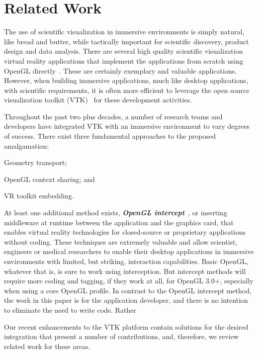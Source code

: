 \section{Related Work}

The use of scientific visualization in immersive environments is simply natural, like bread and butter, while tactically important for scientific discovery, product design and data analysis. There are several high quality scientific visualization virtual reality applications that implement the applications from scratch using OpenGL directly~\cite{Billen:2008, LaViola:2007, Schulze:2001, Rantzau:1998}. These are certainly exemplary and valuable applications. However, when building immersive applications, much like desktop applications, with scientific requirements, it is often more efficient to leverage the open source visualization toolkit (VTK)~\cite{Schroeder:2004} for these development activities.

Throughout the past two plus decades, a number of research teams and developers have integrated VTK with an immersive environment to vary degrees of success. There exist three fundamental approaches to the proposed amalgamation: 

\begin{compactitem}
\item Geometry transport;
\item OpenGL context sharing; and
\item VR toolkit embedding.
\end{compactitem}

At least one additional method exists, \textit{\textbf{OpenGL intercept}}~\cite{Humphreys:2001,Humphreys:2002,Zielinski:2014,TechViz:2016,Conduit:2016}, or inserting middleware at runtime between the application and the graphics card, that enables virtual reality technologies for closed-source or proprietary applications without coding. These techniques are extremely valuable and allow scientist, engineers or medical researchers to enable their desktop applications in immersive environments with limited, but striking, interaction capabilities. Basic OpenGL, whatever that is, is sure to work using interception. But intercept methods will require more coding and tagging, if they work at all, for OpenGL 3.0+, especially when using a core OpenGL profile. In contrast to the OpenGL intercept method, the work in this paper is for the application developer, and there is no intention to eliminate the need to write code. Rather 

Our recent enhancements to the VTK platform contain solutions for the desired integration that present a number of contributions, and, therefore, we review related work for these areas.

